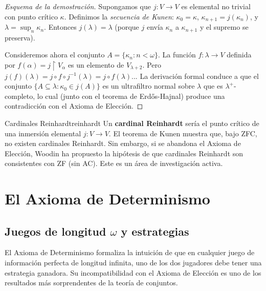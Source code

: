 \begin{proof}[Esquema de la demostración]
Supongamos que $j: V \to V$ es elemental no trivial con punto crítico $\kappa$. Definimos la \emph{secuencia de Kunen}: $\kappa_0 = \kappa$, $\kappa_{n+1} = j(\kappa_n)$, y $\lambda = \sup_n \kappa_n$. Entonces $j(\lambda) = \lambda$ (porque $j$ envía $\kappa_n$ a $\kappa_{n+1}$ y el supremo se preserva).

Consideremos ahora el conjunto $A = \{\kappa_n : n < \omega\}$. La función $f: \lambda \to V$ definida por $f(\alpha) = j\restriction V_\alpha$ es un elemento de $V_{\lambda+2}$. Pero $j(f)(\lambda) = j \circ f \circ j^{-1}(\lambda) = j \circ f(\lambda)$... La derivación formal conduce a que el conjunto $\{A \subseteq \lambda : \kappa_0 \in j(A)\}$ es un ultrafiltro normal sobre $\lambda$ que es $\lambda^+$-completo, lo cual (junto con el teorema de Erdős-Hajnal) produce una contradicción con el Axioma de Elección.
\end{proof}

\begin{observacion}{Cardinales Reinhardt}{reinhardt}
Un \textbf{cardinal Reinhardt} sería el punto crítico de una inmersión elemental $j: V \to V$. El teorema de Kunen muestra que, bajo ZFC, no existen cardinales Reinhardt. Sin embargo, si se abandona el Axioma de Elección, Woodin ha propuesto la hipótesis de que cardinales Reinhardt son consistentes con ZF (sin AC). Este es un área de investigación activa.
\end{observacion}

\section{El Axioma de Determinismo}

\subsection{Juegos de longitud $\omega$ y estrategias}

El Axioma de Determinismo formaliza la intuición de que en cualquier juego de información perfecta de longitud infinita, uno de los dos jugadores debe tener una estrategia ganadora. Su incompatibilidad con el Axioma de Elección es uno de los resultados más sorprendentes de la teoría de conjuntos.

